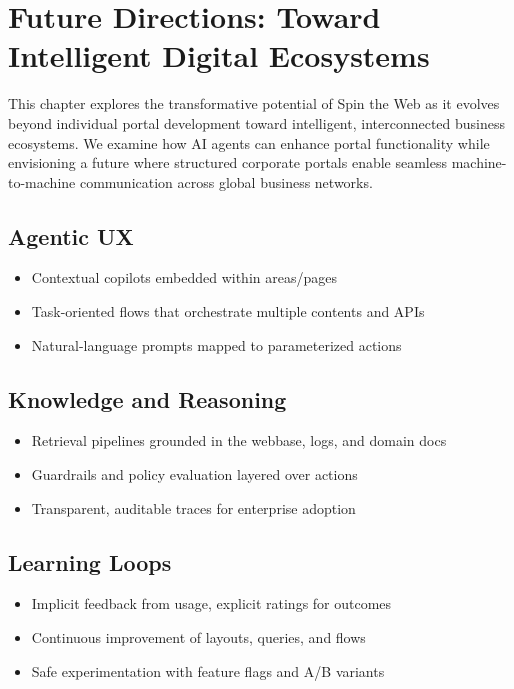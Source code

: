 
\chapter{Future Directions: Toward Intelligent Digital Ecosystems}
\label{chap:future-directions}

This chapter explores the transformative potential of Spin the Web as it evolves beyond individual portal development toward intelligent, interconnected business ecosystems. We examine how AI agents can enhance portal functionality while envisioning a future where structured corporate portals enable seamless machine-to-machine communication across global business networks.

\section{Agentic UX}
\begin{itemize}
	\item Contextual copilots embedded within areas/pages
	\item Task-oriented flows that orchestrate multiple contents and APIs
	\item Natural-language prompts mapped to parameterized actions
\end{itemize}

\section{Knowledge and Reasoning}
\begin{itemize}
	\item Retrieval pipelines grounded in the webbase, logs, and domain docs
	\item Guardrails and policy evaluation layered over actions
	\item Transparent, auditable traces for enterprise adoption
\end{itemize}

\section{Learning Loops}
\begin{itemize}
	\item Implicit feedback from usage, explicit ratings for outcomes
	\item Continuous improvement of layouts, queries, and flows
	\item Safe experimentation with feature flags and A/B variants
\end{itemize}

